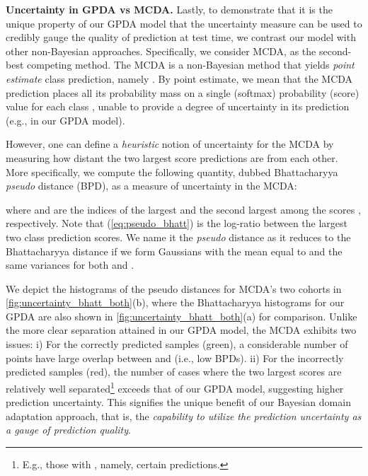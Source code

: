 \documentclass[10pt,letterpaper]{article}
\begin{document}
\noindent\textbf{Uncertainty in GPDA vs MCDA.}  Lastly, to demonstrate that it is the unique property of our GPDA model that the uncertainty measure can be used to credibly gauge the quality of prediction at test time, we contrast our model with other non-Bayesian approaches. Specifically, we consider MCDA, as the second-best competing method. The MCDA is a non-Bayesian method that yields {\em point estimate} class prediction, namely . By point estimate, we mean that the MCDA prediction places all its probability mass on a single (softmax) probability (score) value  for each class , unable to provide a degree of uncertainty in its prediction (e.g.,  in our GPDA model). 

However, one can define a {\em heuristic} notion of uncertainty for the MCDA by measuring how distant the two largest score predictions are from each other. More specifically, we compute the following quantity, dubbed Bhattacharyya {\em  pseudo} distance (BPD), as a measure of uncertainty in the MCDA:

where  and  are the indices of the largest and the second largest among the scores , respectively. 
Note that (\ref{eq:pseudo_bhatt}) is the log-ratio between the largest two class prediction scores. We name it the {\em  pseudo} distance as it reduces to the Bhattacharyya distance if we form Gaussians with the mean equal to  and the same variances for both  and .

We depict the histograms of the pseudo distances for MCDA's two cohorts in \autoref{fig:uncertainty_bhatt_both}(b), where the Bhattacharyya histograms for our GPDA are also shown in \autoref{fig:uncertainty_bhatt_both}(a) for comparison. Unlike the more clear separation attained in our GPDA model, the MCDA exhibits two issues: i) For the correctly predicted samples (green), a considerable number of points have large overlap between  and  (i.e., low BPDs).
ii) For the incorrectly predicted samples (red), the number of cases where the two largest scores are relatively well separated\footnote{E.g., those with , namely, certain predictions.} exceeds that of our GPDA model, suggesting higher prediction uncertainty.
This signifies the unique benefit of our Bayesian domain adaptation approach, that is, the \textit{capability to utilize the prediction uncertainty as a gauge of prediction quality}.\\
\end{document}
